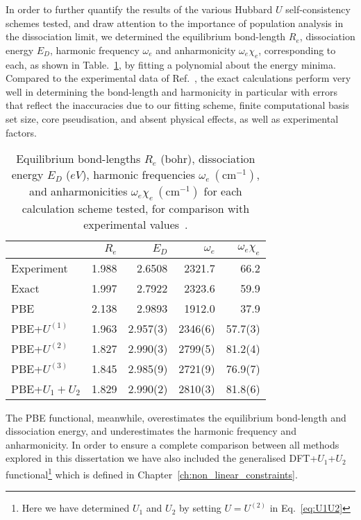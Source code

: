 In order to further quantify the results  
of the various Hubbard $U$ self-consistency schemes tested, 
and draw attention to the importance 
of population analysis in the dissociation limit, 
we determined the equilibrium 
bond-length $R_e$, 
dissociation energy $E_D$, 
harmonic frequency $\omega_e$ 
and anharmonicity $\omega_e\chi_e$, 
corresponding to  each, as shown in  Table.~\ref{table2}, 
by fitting a polynomial  
about the energy  minima.
Compared to the 
experimental data of 
Ref.~\cite{HERZBERG1972425}, 
the exact calculations perform very well in determining 
the bond-length and harmonicity 
in particular with errors that reflect the 
inaccuracies due to our fitting scheme, finite 
computational basis set size, core pseudisation, and
absent physical effects, as well as experimental factors.
%
\begin{table}[th!]
\begin{tabular*}{\columnwidth}{@{\extracolsep{\fill}}lrrrr}
\hline \hline
 &$R_e$  	&$E_D$	 &$\omega_e$&$\omega_e\chi_e$\\
\hline
Experiment~\cite{HERZBERG1972425}
			& 1.988		& 2.6508		& 2321.7		& 66.2 \\
Exact		& 1.997		& 2.7922		& 2323.6	& 59.9 \\
PBE			& 2.138		& 2.9893		& 1912.0	& 37.9 \\
PBE+$U^{(1)}$	& 1.963		& 2.957(3)		& 2346(6)		& 57.7(3)\\
PBE+$U^{(2)}$	& 1.827		& 2.990(3) 	& 2799(5)		& 81.2(4)\\
PBE+$U^{(3)}$	& 1.845		& 2.985(9) 	& 2721(9)		& 76.9(7)\\
PBE+$U_1 + U_2$ & 1.829 	& 2.990(2)		& 2810(3)		& 81.8(6)\\ 
\hline
\hline
\end{tabular*}
\caption{
Equilibrium bond-lengths $R_e$ (bohr), dissociation energy $E_D$ ($eV$), 
harmonic frequencies $\omega_e\ (\textrm{cm}^{-1})$, 
and anharmonicities $\omega_e\chi_e\ (\textrm{cm}^{-1})$ 
for each calculation scheme tested, for comparison with 
experimental values~\cite{HERZBERG1972425}.}
\label{table2}
\end{table}

The PBE functional, meanwhile, 
overestimates the equilibrium bond-length 
and dissociation energy,  
and underestimates the harmonic frequency and anharmonicity.
%
In order to ensure a complete comparison 
between all methods explored in this dissertation  
we have also included 
the generalised DFT+$U_1$+$U_2$ 
functional\footnote{Here we have determined $U_1$ and $U_2$ 
by setting $U= U^{(2)}$ in Eq.~\eqref{eq:U1U2}} 
which is defined in Chapter~\ref{ch:non_linear_constraints}.
%

